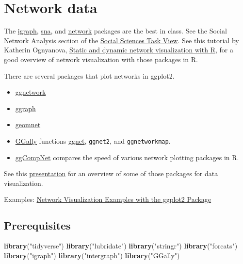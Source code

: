 \documentclass[]{book}
\newenvironment{Shaded}{\begin{snugshade}}{\end{snugshade}}
\newcommand{\KeywordTok}[1]{\textcolor[rgb]{0.13,0.29,0.53}{\textbf{#1}}}
\newcommand{\NormalTok}[1]{#1}
\newcommand{\StringTok}[1]{\textcolor[rgb]{0.31,0.60,0.02}{#1}}
\providecommand{\tightlist}{%
  \setlength{\itemsep}{0pt}\setlength{\parskip}{0pt}}
\theoremstyle{definition}
\theoremstyle{definition}
\theoremstyle{definition}
\theoremstyle{remark}
\begin{document}
\hypertarget{network-data}{%
\section{Network data}\label{network-data}}

The \href{https://cran.r-project.org/package=igraph}{igraph},
\href{https://cran.r-project.org/package=sna}{sna}, and
\href{https://cran.r-project.org/package=network}{network} packages are
the best in class. See the Social Network Analysis section of the
\href{https://cran.r-project.org/web/views/SocialSciences.html}{Social
Sciences Task View}. See this tutorial by Katherin Ognyanova,
\href{https://rpubs.com/kateto/netviz}{Static and dynamic network
visualization with R}, for a good overview of network visualization with
those packages in R.

There are several packages that plot networks in ggplot2.

\begin{itemize}
\tightlist
\item
  \href{https://cran.r-project.org/package=ggnetwork}{ggnetwork}
\item
  \href{https://cran.r-project.org/package=ggraph}{ggraph}
\item
  \href{https://cran.r-project.org/package=geomnet}{geomnet}
\item
  \href{https://cran.r-project.org/package=GGally}{GGally} functions
  \href{https://ggobi.github.io/ggally/rd.html\#ggnet}{ggnet},
  \texttt{ggnet2}, and \texttt{ggnetworkmap}.
\item
  \href{https://cran.r-project.org/package=ggCompNet}{ggCompNet}
  compares the speed of various network plotting packages in R.
\end{itemize}

See this
\href{http://curleylab.psych.columbia.edu/netviz/netviz1.html\#/12}{presentation}
for an overview of some of those packages for data visualization.

Examples:
\href{https://cran.r-project.org/web/packages/ggCompNet/vignettes/examples-from-paper.html}{Network
Visualization Examples with the ggplot2 Package}

\hypertarget{prerequisites-5}{%
\subsection*{Prerequisites}\label{prerequisites-5}}

\begin{Shaded}
\begin{Highlighting}[]
\KeywordTok{library}\NormalTok{(}\StringTok{"tidyverse"}\NormalTok{)}
\KeywordTok{library}\NormalTok{(}\StringTok{"lubridate"}\NormalTok{)}
\KeywordTok{library}\NormalTok{(}\StringTok{"stringr"}\NormalTok{)}
\KeywordTok{library}\NormalTok{(}\StringTok{"forcats"}\NormalTok{)}
\KeywordTok{library}\NormalTok{(}\StringTok{"igraph"}\NormalTok{)}
\KeywordTok{library}\NormalTok{(}\StringTok{"intergraph"}\NormalTok{)}
\KeywordTok{library}\NormalTok{(}\StringTok{"GGally"}\NormalTok{)}
\end{Highlighting}
\end{Shaded}
\end{document}
